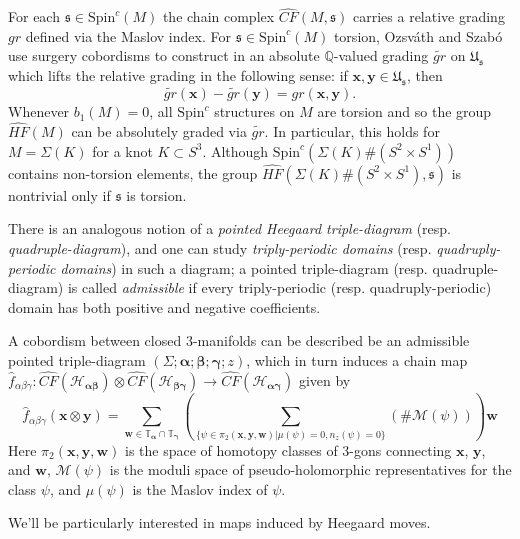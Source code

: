 \documentclass[11pt]{article}
\theoremstyle{plain} \newtheorem{thm}{Theorem}[subsection]
\theoremstyle{plain} \newtheorem{cor}[thm]{Corollary}
\theoremstyle{plain} \newtheorem{prop}[thm]{Proposition}
\theoremstyle{plain} \newtheorem{conj}[thm]{Conjecture}
\theoremstyle{plain} \newtheorem{lem}[thm]{Lemma}
\theoremstyle{definition} \newtheorem{df}[thm]{Definition}
\theoremstyle{remark} \newtheorem{rmk}[thm]{Remark}
\theoremstyle{remark} \newtheorem{obs}[thm]{Observation}
\newcommand{\DBCs}[1]{\Sigma(#1)\#(S^{2}\times S^{1})}
\newcommand{\DBC}[1]{\Sigma(#1)}
\newcommand{\h}{\mathcal{H}}
\newcommand{\tld}[1]{\widetilde{#1}}
\newcommand{\OS}{Ozsv\'ath and Szab\'o }
\newcommand{\Us}{\mathfrak{U}_{\mathfrak{s}}}
\newcommand{\HFxs}[1]{\widehat{HF}(\DBCs{#1}, \mathfrak{s})}
\newcommand{\ba}{\boldsymbol{\alpha}}
\newcommand{\bb}{\boldsymbol{\beta}}
\newcommand{\bg}{\boldsymbol{\gamma}}
\newcommand{\Ta}{\mathbb{T}_{\ba}}
\newcommand{\Tg}{\mathbb{T}_{\bg}}
\newcommand{\bx}{\mathbf{x}}
\newcommand{\by}{\mathbf{y}}
\newcommand{\bw}{\mathbf{w}}
\numberwithin{equation}{section}
\begin{document}
For each $\mathfrak{s} \in \text{Spin}^{c}(M)$ the chain complex $\widehat{CF}(M,\mathfrak{s})$ carries a relative grading $gr$ defined via the Maslov index.  For $\mathfrak{s} \in \text{Spin}^{c}(M)$ torsion, \OS use surgery cobordisms to construct in \cite{os:tri} an absolute $\mathbb{Q}$-valued grading $\tld{gr}$ on $\Us$ which lifts the relative grading in the following sense: if $\bx, \by \in \Us$, then
\begin{equation*}
\tld{gr}(\bx) - \tld{gr}(\by) = gr(\bx, \by). 
\end{equation*}
Whenever $b_{1}(M) = 0$, all $\text{Spin}^{c}$ structures on $M$ are torsion and so the group $\widehat{HF}(M)$ can be absolutely graded via $\tld{gr}$.  In particular, this holds for $M =\DBC{K}$ for a knot $K \subset S^{3}$.  Although $\text{Spin}^{c}(\DBCs{K})$ contains non-torsion elements, the group $\HFxs{K}$ is nontrivial only if $\mathfrak{s}$ is torsion.  

There is an analogous notion of a \textit{pointed Heegaard triple-diagram} (resp. \textit{quadruple-diagram}), and one can study \textit{triply-periodic domains} (resp. \textit{quadruply-periodic domains}) in such a diagram; a pointed triple-diagram (resp. quadruple-diagram) is called \textit{admissible} if every triply-periodic (resp. quadruply-periodic) domain has both positive and negative coefficients.

A cobordism between closed 3-manifolds can be described be an admissible pointed triple-diagram $\left(\Sigma; \ba; \bb; \bg; z\right)$, which in turn induces a chain map $\widehat{f}_{\alpha\beta\gamma}: \widehat{CF}(\h_{\ba\bb}) \otimes  \widehat{CF}(\h_{\bb\bg}) \rightarrow  \widehat{CF}(\h_{\ba\bg})$ given by
\begin{equation*}
\widehat{f}_{\alpha\beta\gamma}(\bx \otimes \by) =
\displaystyle\sum_{\bw \in \Ta \cap \Tg} \left( \displaystyle\sum_{\{\psi \in \pi_{2}(\bx, \by, \bw)| \mu(\psi) = 0, n_{z}(\psi) = 0\}} \left(\# \mathcal{M}\left(\psi\right)\right)\right)\bw
\end{equation*}
Here $\pi_2(\bx, \by, \bw)$ is the space of homotopy classes of 3-gons connecting $\bx$, $\by$, and $\bw$, $\mathcal{M}\left( \psi \right)$ is the moduli space of pseudo-holomorphic representatives for the class $\psi$, and $\mu(\psi)$ is the Maslov index of $\psi$.

We'll be particularly interested in maps induced by Heegaard moves.
\end{document}
